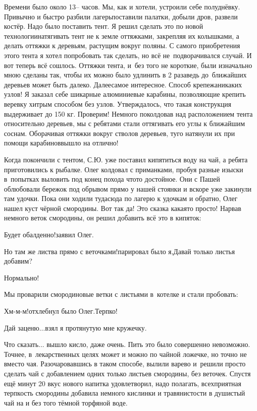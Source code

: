 Времени было около 13\thinspace\nobreakdash-- часов. Мы, как и хотели, устроили себе полуднёвку. Привычно и быстро разбили лагерь\mdash поставили палатки, добыли дров, развели костёр. Надо было поставить тент. Я решил сделать это по новой технологии\mdash натягивать тент не к земле оттяжками, закрепляя их колышками, а делать оттяжки к деревьям, растущим вокруг поляны. С самого приобретения этого тента я хотел попробовать так сделать, но всё не~подворачивался случай. И вот теперь всё сошлось. Оттяжки тента, и~без того не короткие, были изначально мною сделаны так, чтобы их можно было удлинить в 2 раза\mdash ведь до~ближайших деревьев может быть далеко. Далее\mdash самое интересное. Способ крепежа\mdash никаких узлов! Я заказал себе шикарные алюминиевые карабины, позволяющие крепить веревку хитрым способом без узлов. Утверждалось, что такая конструкция выдерживает до 150 кг. Проверим! Немного поколдовав над расположением тента относительно деревьев, мы с ребятами стали оттягивать его углы к ближайшим соснам. Оборачивая оттяжки вокруг стволов деревьев, туго натянули их при помощи карабинов\mdash вышло на отлично!

Когда покончили с тентом, С.Ю. уже поставил кипятиться воду на чай, а ребята приготовились к рыбалке. Олег колдовал с приманками, пробуя разные изыски в~попытках выловить под конец похода что\sdash то достойное. Они с Пашей облюбовали бережок под обрывом прямо у нашей стоянки и вскоре уже закинули там удочки. Пока они ходили туда\sdash сюда по лагерю к удочкам и обратно, Олег нашел куст чёрной смородины. Вот так да! Это сказка какая\sdash то просто! Нарвав немного веток смородины, он решил добавить всё это в кипяток:

\diagdash Будет обалденно!\mdash заявил Олег.

\diagdash Но там же листва прямо с веточками!\mdash парировал было я,\mdash Давай только листья добавим?

\diagdash Нормально!

Мы проварили смородиновые ветки с листьями в~котелке и стали пробовать:

\diagdash Хм-м-м!\mdash отхлебнул было Олег.\mdash Терпко!

\diagdash Дай заценю$\ldots$\mdash взял я протянутую мне кружечку.

Что сказать$\ldots$ вышло кисло, даже очень. Пить это было совершенно невозможно. Точнее, в~лекарственных целях может и можно по чайной ложечке, но точно не вместо чая. Разочаровавшись в таком способе, вылили варево и~решили просто сделать чай с добавлением одних только листьев смородины, без веточек. Спустя ещё минут 20 вкус нового напитка удовлетворил, надо полагать, всех\mdash приятная терпкость смородины добавила немного кислинки и травянистости в душистый чай на и без того тёмной торфяной воде. 

